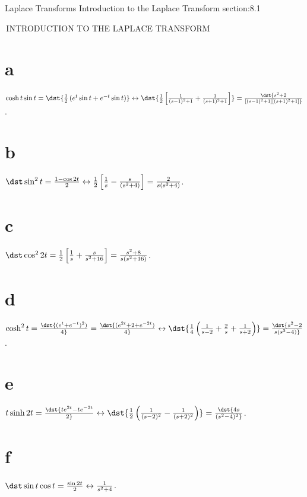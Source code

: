 \documentclass[dvips]{book}
\renewcommand{\exer}[1]{\par\medskip\;\noindent{\color{red}\bf #1.}}
\numberwithin{example}{section}
\numberwithin{equation}{section}
\numberwithin{theorem}{section}
\numberwithin{table}{section}
\numberwithin{figure}{section}
\begin{document}
\newpage
\thispagestyle{empty}

\setcounter{chapter}{8}

 {Laplace Transforms}
{Introduction to the Laplace Transform}
 {section:8.1}

\renewcommand{\thissection}{\sectiontitle
{\,INTRODUCTION TO THE LAPLACE TRANSFORM}}
\thissection

\vspace*{-17.2pt}

\exer{8.1.2} \part{a} $\cosh t\sin t=\dst{{1\over
2}\left(e^t\sin t+e^{-t}\sin t\right)}
\leftrightarrow\dst{{1\over2}\left[{1\over(s-1)^2+1}+{1\over(s+1)^2+1}\right]}
=\dst{s^2+2\over[(s-1)^2+1][(s+1)^2+1]}$.



\part{b} $\dst
\sin^2t={1-\cos2t\over2}\leftrightarrow{1\over2}\left[{1\over s}
-{s\over(s^2+4)}\right]={2\over s(s^2+4)}$.

\part{c}  $\dst \cos^22t={1\over2}\left[{1\over s}+{s\over
s^2+16}\right]=
{s^2+8\over s(s^2+16)}$.

\part{d} $\cosh^2
t=\dst{(e^t+e^{-t})^2)\over4}=\dst{(e^{2t}+2+e^{-2t})\over4}
\leftrightarrow\dst{{1\over4}\left({1\over s-2}+{2\over s}+{1\over
s+2}\right)} =\dst{s^2-2\over s(s^2-4)}$.

\part{e} $t\sinh2t=\dst{te^{2t}-te^{-2t}\over2}
\leftrightarrow\dst{{1\over2}\left({1\over(s-2)^2}-{1\over(s+2)^2}\right)}
=\dst{4s\over(s^2-4)^2}$.

\part{f}  $\dst\sin t\cos t={\sin2t\over2}\leftrightarrow{1\over
s^2+4}$.
\end{document}
